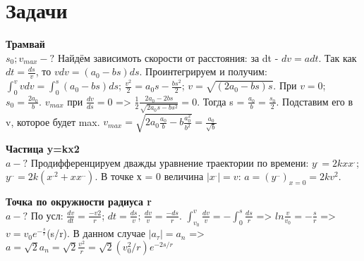 \documentclass{article}
\begin{document}
\section{Задачи}
\begin{minipage}{.3\textwidth}
\textbf{Трамвай}\\
$s_0; v_{max} -?$
Найдём зависимоть скорости от расстояния: за dt - $dv=adt$. Так как $dt = \frac{ds}{v}$, то $vdv =(a_0 -bs)ds$. Проинтегрируем и получим: $\int_{0}^{v}vdv = \int_{0}^{s} (a_0 -bs)ds$;
$\frac{v^2}{2} = a_0s -\frac{bs^2}{2}$; $v = \sqrt{(2a_0 -bs)s} $. При $v = 0$; \textbf{$s_0 = \frac{2a_0}{b}$}. $v_{max}$ при $\frac{dv}{ds} = 0$ => $\frac{1}{2}\frac{2a_0-2bs}{\sqrt{2a_0s-bs^2}}=0$. Тогда s = $\frac{a_0}{b} = \frac{s_0}{2}$. Подставим его в v, которое будет max. $v_{max}=\sqrt{2a_0\frac{a_0}{b}-b\frac{a^2_0}{b^2}} = \frac{a_0}{\sqrt{b}}$
\end{minipage}
\hfill
\begin{minipage}{.3\textwidth}
\textbf{Частица y=kx2}\\
$a-?$
Продифференцируем дважды уравнение траектории по времени: $y^.=2kxx^.$; $y^{..} = 2k(x^{.2}+xx^{..})$.
В точке х = 0 величина $|x^.|=v$: $a=(y^{..})_{x=0}=2kv^2$. 
\end{minipage}
\hfill
\begin{minipage}{.3\textwidth}
\textbf{Точка по окружности радиуса r}\\
$a-?$
По усл: $\frac{dv}{dt} = \frac{-v2}{r}$; $dt=\frac{ds}{v}$; $\frac{dv}{v} = \frac{-ds}{r}$. $\int_{v_0}^{v}\frac{dv}{v}=-\int_{0}^{s}\frac{ds}{r}$ => $ln\frac{v}{v_0}=-\frac{s}{r}$ => $v=v_0e^{-\frac{s}{r}}$(s/r).
В данном случае $|a_{\tau}|=a_n$ => $a=\sqrt{2}a_n=\sqrt{2}\frac{v^2}{r} = \sqrt{2}(v_0^2/r)e^{-2s/r}$
\end{minipage}
\end{document}
